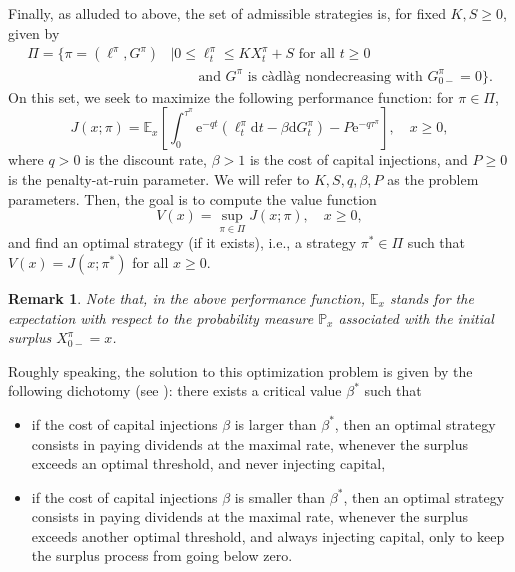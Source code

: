 \documentclass[11pt,reqno]{amsart}
\newtheorem{remark}[theorem]{Remark}
\newcommand{\p}{\mathbb{P}}
\newcommand{\E}{\mathbb{E}}
\newcommand{\e}{\mathrm{e}}
\newcommand{\diff}{\mathrm{d}}
\renewcommand{\geq}{\geqslant}
\renewcommand{\leq}{\leqslant}
\begin{document}
Finally, as alluded to above, the set of admissible strategies is, for fixed $K,S \geq 0$, given by
\begin{align}
    \Pi = \{\pi = (\ell^\pi, G^\pi) &\mid 0 \leq \ell^\pi_t \leq KX^\pi_t + S \text{ for all $t\geq 0$} \\
    &\qquad \text{and $G^\pi$ is càdlàg  nondecreasing with $G^\pi_{0-} = 0$}\}.
\end{align}
On this set, we seek to maximize the following performance function: for $\pi \in \Pi$,
\begin{equation}\label{J-gen}
    J(x;\pi) = \E_x \left[\int_0^{\tau^\pi}\e^{-qt}\left(\ell^\pi_t \diff t - \beta\diff G^\pi_t\right) - P\e^{-q\tau^\pi} \right] , \quad x \geq 0 ,
\end{equation}
where $q>0$ is the discount rate, $\beta >1$ is the cost of capital injections, and $P\geq 0$ is the penalty-at-ruin parameter. We will refer to $K,S,q,\beta,P$ as the problem parameters. Then, the goal is to compute the value function
\begin{equation}
    V(x) = \sup_{\pi\in\Pi}J(x;\pi) , \quad x\geq 0 ,
\end{equation}
and find an optimal strategy (if it exists), i.e., a strategy $\pi^*\in\Pi $ such that $V(x) = J(x;\pi^*)$ for all $x\geq 0$.

\begin{remark}
Note that, in the above performance function, $\E_x$ stands for the expectation with respect to the probability measure $\p_x$ associated with the initial surplus $X^\pi_{0-} = x$.
\end{remark}

Roughly speaking, the solution to this optimization problem is given by the following dichotomy (see \cite{renaud-et-al_2023}): there exists a critical value $\beta^*$ such that
\begin{itemize}
\item if the cost of capital injections $\beta$ is larger than $\beta^*$, then an optimal strategy consists in paying dividends at the maximal rate, whenever the surplus exceeds an optimal threshold, and never injecting capital,
\item if the cost of capital injections $\beta$ is smaller than $\beta^*$, then an optimal strategy consists in paying dividends at the maximal rate, whenever the surplus exceeds another optimal threshold, and always injecting capital, only to keep the surplus process from going below zero.
\end{itemize}
\end{document}
